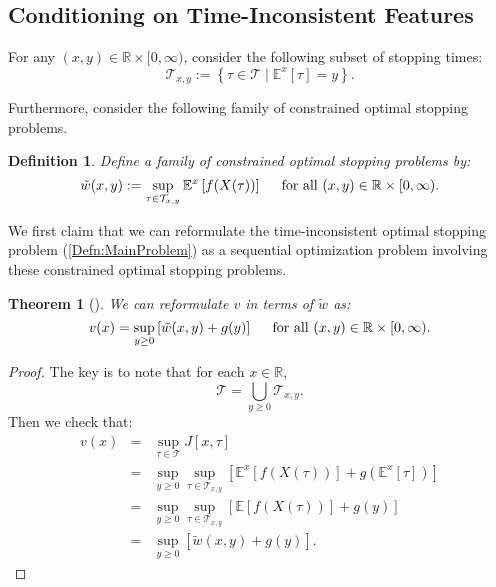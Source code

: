 \documentclass[11pt]{article}
\newtheorem{defn}{Definition}
\newtheorem{thm}{Theorem}
\begin{document}
\subsection{Conditioning on Time-Inconsistent Features}

For any $(x,y)\in\mathbb{R}\times[0,\infty)$, consider the following subset of stopping times:
\begin{equation}
\mathcal{T}_{x,y} := \left\{\tau\in\mathcal{T}\mid\mathbb{E}^x\left[\tau\right]=y\right\}.
\end{equation}

Furthermore, consider the following family of constrained optimal stopping problems.

\begin{defn}\label{Defn:ConstrainedFunctions}Define a family of constrained optimal stopping problems by:
\[\tilde{w}(x,y) := \sup\limits_{\tau\in\mathcal{T}_{x,y}} \mathbb{E}^x\left[f(X(\tau))\right]\hspace{0.5cm}\text{for all }(x,y)\in\mathbb{R}\times [0,\infty).\]\end{defn}

We first claim that we can reformulate the time-inconsistent optimal stopping problem (\ref{Defn:MainProblem}) as a sequential optimization problem involving these constrained optimal stopping problems.

\begin{thm}[\cite{PedersenPeskir2013}]
\label{Thm:AuxEquivalence}We can reformulate $v$ in terms of $\tilde{w}$ as:
\[v(x) = \sup\limits_{y\geq 0} \left[\tilde{w}(x,y) + g(y)\right]\hspace{0.5cm}\text{for all }(x,y)\in\mathbb{R}\times [0,\infty).\]\end{thm}
\begin{proof}
The key is to note that for each $x\in\mathbb{R}$,
\[\mathcal{T} = \bigcup_{y\geq 0}\mathcal{T}_{x,y}.\]
Then we check that:
\begin{eqnarray}
v(x) & = & \sup\limits_{\tau\in\mathcal{T}} J\left[x,\tau\right]\nonumber\\
& = & \sup\limits_{y\geq 0}\sup\limits_{\tau\in\mathcal{T}_{x,y}} \left[\mathbb{E}^x\left[f(X(\tau ))\right]+ g\left(\mathbb{E}^x\left[\tau\right]\right)\right]\nonumber\\
& = & \sup\limits_{y\geq 0}\sup\limits_{\tau\in\mathcal{T}_{x,y}}\left[\mathbb{E}\left[f(X(\tau ))\right]+ g(y)\right]\nonumber\\
& = & \sup\limits_{y\geq 0}\left[\tilde{w}(x,y)+g(y)\right].\nonumber
\end{eqnarray}
\end{proof}
\end{document}
